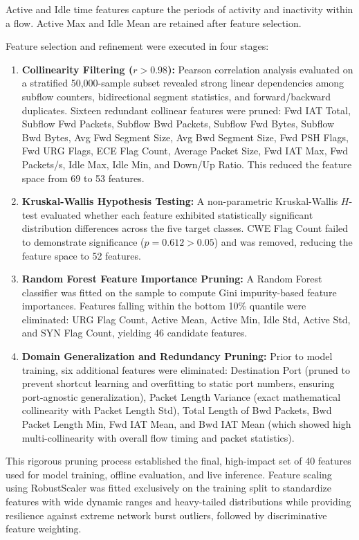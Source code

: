 \documentclass[12pt,a4paper]{report}
\begin{document}
Active and Idle time features capture the periods of activity and inactivity within a flow. Active Max and Idle Mean are retained after feature selection.

Feature selection and refinement were executed in four stages:
\begin{enumerate}
    \item \textbf{Collinearity Filtering ($r > 0.98$):} Pearson correlation analysis evaluated on a stratified 50,000-sample subset revealed strong linear dependencies among subflow counters, bidirectional segment statistics, and forward/backward duplicates. Sixteen redundant collinear features were pruned: Fwd IAT Total, Subflow Fwd Packets, Subflow Bwd Packets, Subflow Fwd Bytes, Subflow Bwd Bytes, Avg Fwd Segment Size, Avg Bwd Segment Size, Fwd PSH Flags, Fwd URG Flags, ECE Flag Count, Average Packet Size, Fwd IAT Max, Fwd Packets/s, Idle Max, Idle Min, and Down/Up Ratio. This reduced the feature space from 69 to 53 features.
    \item \textbf{Kruskal-Wallis Hypothesis Testing:} A non-parametric Kruskal-Wallis $H$-test evaluated whether each feature exhibited statistically significant distribution differences across the five target classes. CWE Flag Count failed to demonstrate significance ($p = 0.612 > 0.05$) and was removed, reducing the feature space to 52 features.
    \item \textbf{Random Forest Feature Importance Pruning:} A Random Forest classifier was fitted on the sample to compute Gini impurity-based feature importances. Features falling within the bottom 10\% quantile were eliminated: URG Flag Count, Active Mean, Active Min, Idle Std, Active Std, and SYN Flag Count, yielding 46 candidate features.
    \item \textbf{Domain Generalization and Redundancy Pruning:} Prior to model training, six additional features were eliminated: Destination Port (pruned to prevent shortcut learning and overfitting to static port numbers, ensuring port-agnostic generalization), Packet Length Variance (exact mathematical collinearity with Packet Length Std), Total Length of Bwd Packets, Bwd Packet Length Min, Fwd IAT Mean, and Bwd IAT Mean (which showed high multi-collinearity with overall flow timing and packet statistics).
\end{enumerate}
This rigorous pruning process established the final, high-impact set of 40 features used for model training, offline evaluation, and live inference. Feature scaling using RobustScaler was fitted exclusively on the training split to standardize features with wide dynamic ranges and heavy-tailed distributions while providing resilience against extreme network burst outliers, followed by discriminative feature weighting.
\end{document}
